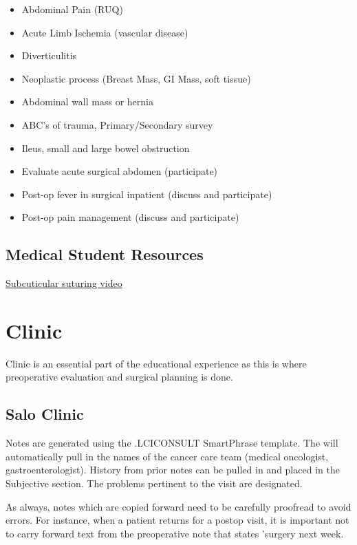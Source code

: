 \documentclass[
]{book}
\providecommand{\tightlist}{%
  \setlength{\itemsep}{0pt}\setlength{\parskip}{0pt}}
\begin{document}
\begin{itemize}
\tightlist
\item
  Abdominal Pain (RUQ)
\item
  Acute Limb Ischemia (vascular disease)
\item
  Diverticulitis
\item
  Neoplastic process (Breast Mass, GI Mass, soft tissue)
\item
  Abdominal wall mass or hernia
\item
  ABC's of trauma, Primary/Secondary survey
\item
  Ileus, small and large bowel obstruction
\item
  Evaluate acute surgical abdomen (participate)
\item
  Post-op fever in surgical inpatient (discuss and participate)
\item
  Post-op pain management (discuss and participate)
\end{itemize}

\hypertarget{medical-student-resources}{%
\section{Medical Student Resources}\label{medical-student-resources}}

\href{https://www.youtube.com/watch?v=M3vISruyFkI}{Subcuticular suturing video}

\hypertarget{clinic-1}{%
\chapter{Clinic}\label{clinic-1}}

Clinic is an essential part of the educational experience as this is where preoperative evaluation and surgical planning is done.

\hypertarget{salo-clinic}{%
\section{Salo Clinic}\label{salo-clinic}}

Notes are generated using the .LCICONSULT SmartPhrase template. The will automatically pull in the names of the cancer care team (medical oncologist, gastroenterologist). History from prior notes can be pulled in and placed in the Subjective section. The problems pertinent to the visit are designated.

As always, notes which are copied forward need to be carefully proofread to avoid errors. For instance, when a patient returns for a postop visit, it is important not to carry forward text from the preoperative note that states 'surgery next week.
\end{document}
